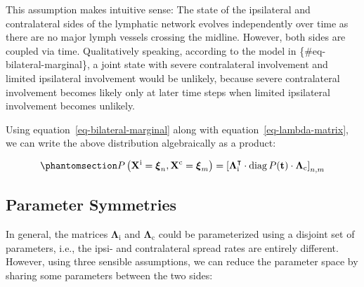 \documentclass[
  sn-mathphys-num,
]{sn-jnl}
\begin{document}
This assumption makes intuitive sense: The state of the ipsilateral and
contralateral sides of the lymphatic network evolves independently over
time as there are no major lymph vessels crossing the midline. However,
both sides are coupled via time. Qualitatively speaking, according to
the model in \{\#eq-bilateral-marginal\}, a joint state with severe
contralateral involvement and limited ipsilateral involvement would be
unlikely, because severe contralateral involvement becomes likely only
at later time steps when limited ipsilateral involvement becomes
unlikely.

Using equation~\ref{eq-bilateral-marginal} along with
equation~\ref{eq-lambda-matrix}, we can write the above distribution
algebraically as a product:

\begin{equation}\phantomsection\label{eq-bilateral-marginal-algebra}{
P \left( \mathbf{X}^\text{i} = \boldsymbol{\xi}_n, \mathbf{X}^\text{c} = \boldsymbol{\xi}_m \right) = \left[ \boldsymbol{\Lambda}^\intercal_\text{i} \cdot \operatorname{diag} P(\mathbf{t}) \cdot \boldsymbol{\Lambda}_\text{c} \right]_{n,m}
}\end{equation}

\subsection{Parameter Symmetries}\label{sec-params-symmetry}

In general, the matrices \(\boldsymbol{\Lambda}_\text{i}\) and
\(\boldsymbol{\Lambda}_\text{c}\) could be parameterized using a
disjoint set of parameters, i.e., the ipsi- and contralateral spread
rates are entirely different. However, using three sensible assumptions,
we can reduce the parameter space by sharing some parameters between the
two sides:
\end{document}
